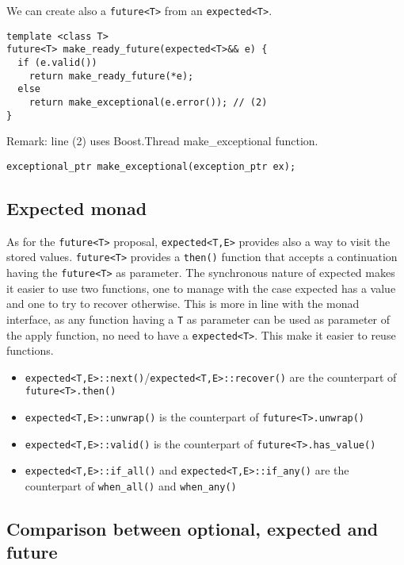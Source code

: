 \documentclass[a4paper,10pt]{article}
\newcommand{\cpp}[1]{\lstinline{#1}}
\begin{document}
We can create also a \cpp{future<T>} from an \cpp{expected<T>}.

\begin{lstlisting}
template <class T>
future<T> make_ready_future(expected<T>&& e) {
  if (e.valid()) 
    return make_ready_future(*e);
  else 
    return make_exceptional(e.error()); // (2)
}
\end{lstlisting}

Remark: line (2) uses Boost.Thread make_exceptional function.

\begin{lstlisting}
exceptional_ptr make_exceptional(exception_ptr ex);
\end{lstlisting}


\subsection{Expected monad}

As for the \cpp{future<T>} proposal, \cpp{expected<T,E>} provides also a way to visit the stored values.
\cpp{future<T>} provides a \cpp{then()} function that accepts a continuation having the \cpp{future<T>} as parameter. The synchronous nature of expected makes it easier to use two functions, one to manage with the case expected has a value and one to try to recover otherwise. This is more in line with the monad interface, as any function having a \cpp{T} as parameter can be used as parameter of the apply function, no need to have a \cpp{expected<T>}. This make it easier to reuse functions. 

\begin{itemize}
 \item \cpp{expected<T,E>::next()}/\cpp{expected<T,E>::recover()} are the counterpart of \cpp{future<T>.then()}
 \item \cpp{expected<T,E>::unwrap()} is the counterpart of \cpp{future<T>.unwrap()}
 \item \cpp{expected<T,E>::valid()} is the counterpart of \cpp{future<T>.has_value()}
 \item \cpp{expected<T,E>::if_all()} and \cpp{expected<T,E>::if_any()} are the counterpart of \cpp{when_all()} and \cpp{when_any()}
\end{itemize}

\subsection{Comparison between optional, expected and future}
\end{document}
